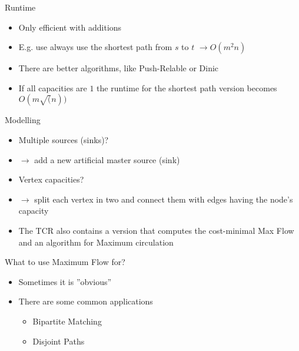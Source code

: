 \documentclass[12pt,t]{beamer}
\newcommand{\bi}{\begin{itemize}}
\newcommand{\ei}{\end{itemize}}
\begin{document}
\begin{frame}{Runtime}
       \bi
	\item Only efficient with additions
	\item E.g. use always use the shortest path from $s$ to $t$ $\rightarrow O(m^2n)$
	\item There are better algorithms, like Push-Relable or Dinic
	\vspace{10pt}
	\item If all capacities are $1$ the runtime for the shortest path version becomes $O(m\sqrt(n))$
       \ei
\end{frame}

\begin{frame}{Modelling}
       \bi
	\item Multiple sources (sinks)?
	\item[$\rightarrow$] add a new artificial master source (sink)
	\vspace{10pt}
	\item Vertex capacities?
	\item[$\rightarrow$] split each vertex in two and connect them with edges having the node's capacity
	\vspace{10pt}
	\item The TCR also contains a version that computes the cost-minimal Max Flow and an algorithm for Maximum circulation
       \ei
\end{frame}

\begin{frame}{What to use Maximum Flow for?}
       \bi
	\item Sometimes it is ''obvious''
	\item There are some common applications
	\bi
	  \item Bipartite Matching
	  \item Disjoint Paths
	\ei
       \ei
\end{frame}
\end{document}
